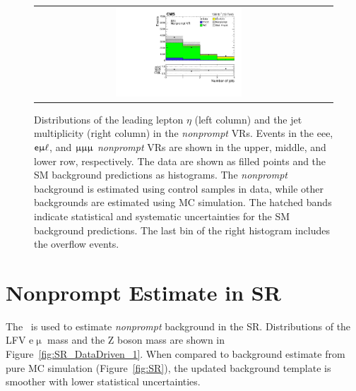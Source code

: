 \begin{figure}[tbh!]
\begin{center}
\begin{tabular}{cc}
 \includegraphics[width=0.45\textwidth]{figures/Part3/Nonprompt/VR/mumumu/njet} \\
 \end{tabular}
 \caption{Distributions of the leading lepton $\eta$ (left column) and the jet multiplicity (right column) in the \emph{nonprompt} \acp{VR}. Events in the eee, $\textsf{e}\upmu\ell$, and $\upmu\upmu\upmu$ \emph{nonprompt} \acp{VR} are shown in the upper, middle, and lower row, respectively. The data are shown as filled points and the \ac{SM} background predictions as histograms. The \emph{nonprompt} background is estimated using control samples in data, while other backgrounds are estimated using \ac{MC} simulation. The hatched bands indicate statistical and systematic uncertainties for the \ac{SM} background predictions. The last bin of the right histogram includes the overflow events.}
 \label{fig:VR_matrix}
 \end{center}
\end{figure}

\section{Nonprompt Estimate in SR}
\label{sec:MMSR}

The \mm~is used to estimate \emph{nonprompt} background in the \ac{SR}. Distributions of the LFV e$\upmu$ mass and the Z boson mass are shown in Figure~\ref{fig:SR_DataDriven_1}. When compared to background estimate from pure \ac{MC} simulation (Figure~\ref{fig:SR}), the updated background template is smoother with lower statistical uncertainties. 

